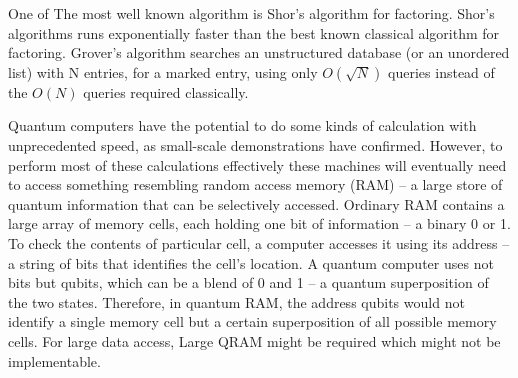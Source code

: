 One of The most well known algorithm is Shor's algorithm for factoring. Shor's algorithms runs exponentially faster than the best known classical algorithm for factoring. Grover's algorithm searches an unstructured database (or an unordered list) with N entries, for a marked entry, using only $O({\sqrt {N}})$ queries instead of the $O(N)$ queries required classically. \par\bigskip
Quantum computers have the potential to do some kinds of calculation with unprecedented speed, as small-scale demonstrations have confirmed. However, to perform most of these calculations effectively these machines will eventually need to access something resembling random access memory (RAM) -- a large store of quantum information that can be selectively accessed. Ordinary RAM contains a large array of memory cells, each holding one bit of information -- a binary 0 or 1. To check the contents of particular cell, a computer accesses it using its address -- a string of bits that identifies the cell's location. A quantum computer uses not bits but qubits, which can be a blend of 0 and 1 -- a quantum superposition of the two states. Therefore, in quantum RAM, the address qubits would not identify a single memory cell but a certain superposition of all possible memory cells.  For large data access, Large QRAM might be required which might not be implementable.

